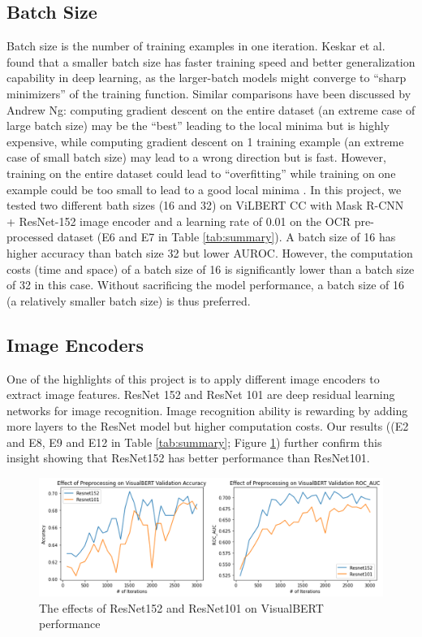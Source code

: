 \documentclass[10pt,twocolumn,letterpaper]{article}
\begin{document}
\subsection{Batch Size}
Batch size is the number of training examples in one iteration. Keskar et al. \cite{h_keskar2017largebatch} found that a smaller batch size has faster training speed and better generalization capability in deep learning, as the larger-batch models might converge to “sharp minimizers” of the training function. Similar comparisons have been discussed by Andrew Ng: computing gradient descent on the entire dataset (an extreme case of large batch size) may be the “best” leading to the local minima but is highly expensive, while computing gradient descent on 1 training example (an extreme case of small batch size) may lead to a wrong direction but is fast. However, training on the entire dataset could lead to “overfitting” while training on one example could be too small to lead to a good local minima \cite{i_Authors14}. In this project, we tested two different bath sizes (16 and 32) on ViLBERT CC with Mask R-CNN + ResNet-152 image encoder and a learning rate of 0.01 on the OCR pre-processed dataset (E6 and E7 in Table \ref{tab:summary}). A batch size of 16 has higher accuracy than batch size 32 but lower AUROC. However, the computation costs (time and space) of a batch size of 16 is significantly lower than a batch size of 32 in this case. Without sacrificing the model performance, a batch size of 16 (a relatively smaller batch size) is thus preferred. 

\subsection{Image Encoders}
One of the highlights of this project is to apply different image encoders to extract image features. ResNet 152 \cite{i_Authors14b} and ResNet 101 \cite{i_Authors14c} are deep residual learning networks for image recognition. Image recognition ability is rewarding by adding more layers to the ResNet model but higher computation costs. Our results ((E2 and E8, E9 and E12 in Table \ref{tab:summary}; Figure \ref{fig:resnet}) further confirm this insight showing that ResNet152 has better performance than ResNet101.

\begin{figure}[t]
\begin{center}
   \includegraphics[width=1 \linewidth]{Figure6.png}
\end{center}
   \caption{The effects of ResNet152 and ResNet101 on VisualBERT performance}
\label{fig:resnet}
\end{figure}
\end{document}
